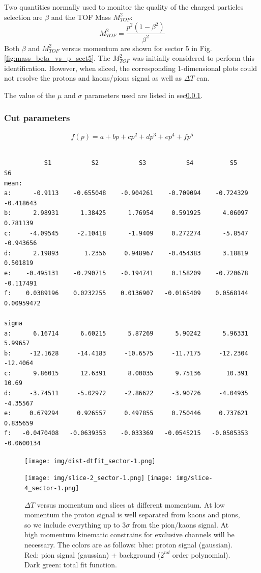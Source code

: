 Two quantities normally used to monitor the quality of the charged particles
selection are $\beta$ and the TOF Mass $M_{TOF}^2$:
$$
 M_{TOF}^2 = \frac{p^2(1-\beta^2)}{\beta^2}
$$
Both $\beta$ and $M_{TOF}^2$ versus momentum are shown for sector 5 in 
Fig.\ref{fig:mass_beta_vs_p_sect5}. The $M_{TOF}^2$ was initially considered
to perform this identification. However, when sliced, the corresponding
1-dimensional plots could not resolve the protons and kaons/pions signal 
as well as $\Delta T$ can.

The value of the $\mu$ and $\sigma$ parameters used are listed in sec\ref{sec:dtp_parameters}.




\subsubsection{Cut parameters}\label{sec:dtp_parameters}
$$
f(p) = a + bp + cp^2 + dp^3 + ep^4 + fp^5
$$
\begin{verbatim}

           S1           S2           S3           S4          S5            S6
mean:
a:      -0.9113    -0.655048    -0.904261    -0.709094    -0.724329    -0.418643
b:      2.98931      1.38425      1.76954     0.591925      4.06097     0.781139
c:     -4.09545     -2.10418      -1.9409     0.272274      -5.8547    -0.943656
d:      2.19893       1.2356     0.948967    -0.454383      3.18819     0.501819
e:    -0.495131    -0.290715    -0.194741     0.158209    -0.720678    -0.117491
f:    0.0389196    0.0232255    0.0136907   -0.0165409    0.0568144   0.00959472

sigma 
a:      6.16714      6.60215      5.87269      5.90242      5.96331      5.99657
b:     -12.1628     -14.4183     -10.6575     -11.7175     -12.2304     -12.4064
c:      9.86015      12.6391      8.00035      9.75136       10.391        10.69
d:     -3.74511     -5.02972     -2.86622     -3.90726     -4.04935     -4.35567
e:     0.679294     0.926557     0.497855     0.750446     0.737621     0.835659
f:   -0.0470408   -0.0639353    -0.033369   -0.0545215   -0.0505353   -0.0600134

\end{verbatim}

\clearpage

\begin{figure}[ht]
  \centering
		\texttt{[image: img/dist-dtfit\_sector-1.png]}
		
		\texttt{[image: img/slice-2\_sector-1.png]}
		\texttt{[image: img/slice-4\_sector-1.png]}
		
		\caption{$\Delta T$ versus momentum and slices at different momentum.
					At low momentum the proton signal is well separated
					from kaons and pions, so we include everything up to
					$3\sigma$ from the pion/kaons signal. At high momentum 
					kinematic constrains for exclusive channels will be necessary.
					The colors are as follows: blue: proton signal (gaussian).
					Red: pion signal (gaussian) + background ($2^{nd}$ order 
					polynomial). Dark green: total fit function.}
 		\label{fig:dt_vs_mom}
\end{figure}



